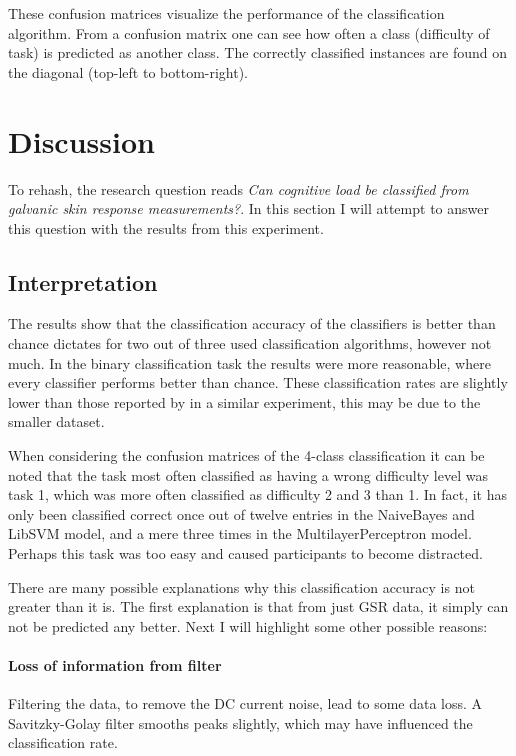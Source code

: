 \documentclass[11pt,leqno,a4paper]{report} %
\begin{document}
These confusion matrices visualize the performance of the classification algorithm. From a confusion matrix one can see how often a class (difficulty of task) is predicted as another class. The correctly classified instances are found on the diagonal (top-left to bottom-right).





\chapter{Discussion}

To rehash, the research question reads \emph{Can cognitive load be classified from galvanic skin response measurements?}. In this section I will attempt to answer this question with the results from this experiment.

\section{Interpretation}

The results show that the classification accuracy of the classifiers is better than chance dictates for two out of three used classification algorithms, however not much. In the binary classification task the results were more reasonable, where every classifier performs better than chance.
These classification rates are slightly lower than those reported by \citet{Nourbakhsh2013} in a similar experiment, this may be due to the smaller dataset.

When considering the confusion matrices of the 4-class classification it can be noted that the task most often classified as having a wrong difficulty level was task 1, which was more often classified as difficulty 2 and 3 than 1. In fact, it has only been classified correct once out of twelve entries in the NaiveBayes and LibSVM model, and a mere three times in the MultilayerPerceptron model. Perhaps this task was too easy and caused participants to become distracted.

There are many possible explanations why this classification accuracy is not greater than it is. The first explanation is that from just GSR data, it simply can not be predicted any better. Next I will highlight some other possible reasons:

\subsubsection{Loss of information from filter}
Filtering the data, to remove the DC current noise, lead to some data loss. A Savitzky-Golay filter smooths peaks slightly, which may have influenced the classification rate.
\end{document}
